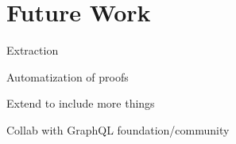 \section{Future Work}

Extraction

Automatization of proofs

Extend to include more things

Collab with GraphQL foundation/community
